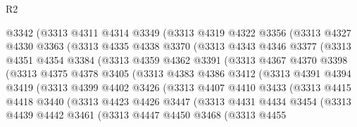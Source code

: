 \begin{lexlean}{R2}
\begin{coremodule}
          @3342
          (@3313
            @4311
            @4314
            @3349
            (@3313
              @4319
              @4322
              @3356
              (@3313
                @4327
                @4330
                @3363
                (@3313
                  @4335
                  @4338
                  @3370
                  (@3313
                    @4343
                    @4346
                    @3377
                    (@3313
                      @4351
                      @4354
                      @3384
                      (@3313
                        @4359
                        @4362
                        @3391
                        (@3313
                          @4367
                          @4370
                          @3398
                          (@3313
                            @4375
                            @4378
                            @3405
                            (@3313
                              @4383
                              @4386
                              @3412
                              (@3313
                                @4391
                                @4394
                                @3419
                                (@3313
                                  @4399
                                  @4402
                                  @3426
                                  (@3313
                                    @4407
                                    @4410
                                    @3433
                                    (@3313
                                      @4415
                                      @4418
                                      @3440
                                      (@3313
                                        @4423
                                        @4426
                                        @3447
                                        (@3313
                                          @4431
                                          @4434
                                          @3454
                                          (@3313
                                            @4439
                                            @4442
                                            @3461
                                            (@3313
                                              @4447
                                              @4450
                                              @3468
                                              (@3313
                                                @4455

\end{coremodule}
\end{lexlean}
